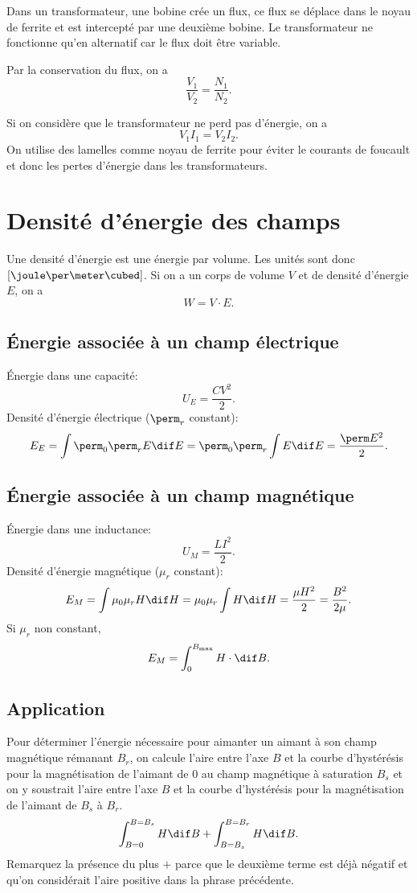 Dans un transformateur, une bobine crée un flux,
ce flux se déplace dans le noyau de ferrite
et est intercepté par une deuxième bobine.
Le transformateur ne fonctionne qu'en alternatif
car le flux doit être variable.

Par la conservation du flux, on a
\[ \frac{V_1}{V_2} = \frac{N_1}{N_2}. \]

Si on considère que le transformateur ne perd pas d'énergie, on a
\[ V_1I_1 = V_2I_2. \]
On utilise des lamelles comme noyau de ferrite pour éviter le
courants de foucault et donc les pertes d'énergie dans les transformateurs.

\section{Densité d'énergie des champs}
Une densité d'énergie est une énergie par volume.
Les unités sont donc $[\joule\per\meter\cubed]$.
Si on a un corps de volume $V$ et de densité d'énergie $E$, on a
\[ W = V \cdot E. \]

\subsection{Énergie associée à un champ électrique}
Énergie dans une capacité:
\[ U_E = \frac{CV^2}{2}. \]
Densité d'énergie électrique ($\perm_r$ constant):
\[ E_E = \int \perm_0 \perm_r E \dif E =
\perm_0 \perm_r \int E \dif E = \frac{\perm E^2}{2}. \]

\subsection{Énergie associée à un champ magnétique}
Énergie dans une inductance:
\[ U_M = \frac{LI^2}{2}. \]
Densité d'énergie magnétique ($\mu_r$ constant):
\[ E_M = \int \mu_0 \mu_r H \dif H = \mu_0 \mu_r \int H \dif H
= \frac{\mu H^2}{2} = \frac{B^2}{2\mu}. \]
Si $\mu_r$ non constant,
\[ E_M = \int_0^{B_\mathrm{max}} H \cdot \dif B. \]

\subsection{Application}
Pour déterminer l'énergie nécessaire pour aimanter
un aimant à son champ magnétique rémanant $B_r$,
on calcule l'aire entre l'axe $B$ et la courbe d'hystérésis
pour la magnétisation de l'aimant de 0 au champ magnétique à saturation
$B_s$ et on y soustrait l'aire entre l'axe $B$
et la courbe d'hystérésis pour la magnétisation de l'aimant de $B_s$ à $B_r$.
\[ \int_{B = 0}^{B = B_s} H \dif B + \int_{B = B_s}^{B = B_r} H \dif B. \]
Remarquez la présence du plus $+$ parce que le deuxième terme est déjà négatif
et qu'on considérait l'aire positive dans la phrase précédente.

